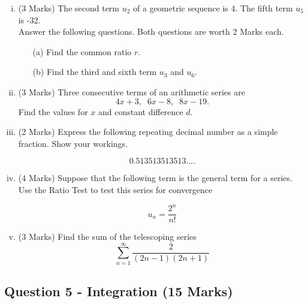 \documentclass[a4paper,12pt]{article}
\begin{document}
\begin{enumerate}[(i)]
	\item (3 Marks)
	The second term $u_2$ of a geometric sequence is 4. The fifth term $u_5$ is -32. \\ \bigskip Answer the following questions. Both questions are worth 2 Marks each.
	\begin{itemize}
		\item[(a)] Find the common ratio $r$. 
		\item[(b)] Find the third and sixth term $u_3$ and $u_6$.
	\end{itemize}
	
	
	\bigskip
	
	\item (3 Marks)	Three consecutive terms of an arithmetic series are 
	\[4x+3,\;\;6x-8,\;\;8x-19.\]
	Find the values for $x$ and constant difference $d$.
	
		\bigskip
		
		\item (2 Marks) Express the following repeating decimal number as a simple fraction. Show your workings.
		
		\[0.513513513513....\]
		
	\bigskip
	\item (4 Marks) Suppose that the following term is the general term for a series. Use the Ratio Test to test this series for convergence
	
	\[u_n=\frac{2^n}{n!}\]
	
	\bigskip
	
	\item (3 Marks) Find the sum of the telescoping series  \[ \sum^{\infty}_{n=1} \frac{2
		}{(2n-1)(2n+1)}\]
	

	\newpage

\end{enumerate}
\subsection*{Question 5 - Integration (15 Marks)}



\end{document}
